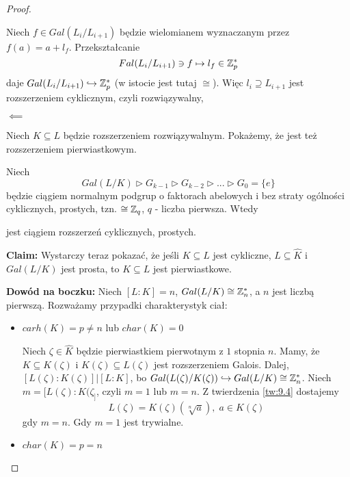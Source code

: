 \begin{proof}
\begin{itemize}
    Niech $f\in Gal(L_i/L_{i+1})$ będzie wielomianem wyznaczanym przez $f(a)=a+l_f$. Przekształcanie
    $$Fal(L_i/L_{i+1})\ni f\mapsto l_f\in \mathbb{Z}_p^*$$
    daje $Gal(L_i/L_{i+1})\hookrightarrow\mathbb{Z}_p^*$ (w istocie jest tutaj $\cong$). Więc $l_i\supseteq L_{i+1}$ jest rozszerzeniem cyklicznym, czyli rozwiązywalny,
\end{itemize}

$\impliedby$

Niech $K\subseteq L$ będzie rozszerzeniem rozwiązywalnym. Pokażemy, że jest też rozszerzeniem pierwiastkowym.

Niech
$$Gal(L/K)\triangleright G_{k-1}\triangleright G_{k-2}\triangleright...\triangleright G_0=\{e\}$$
będzie ciągiem normalnym podgrup o faktorach abelowych i bez straty ogólności cyklicznych, prostych, tzn. $\cong\mathbb{Z}_q$, $q$ - liczba pierwsza. Wtedy
\begin{center}\end{center}
jest ciągiem rozszerzeń cyklicznych, prostych.

\textbf{Claim:} Wystarczy teraz pokazać, że jeśli $K\subseteq L$ jest cykliczne, $L\subseteq\hat{K}$ i $Gal(L/K)$ jest prosta, to $K\subseteq L$ jest pierwiastkowe.

\textbf{Dowód na boczku:} Niech $[L:K]=n$, $Gal(L/K)\cong\mathbb{Z}_n^*$, a $n$ jest liczbą pierwszą. Rozważamy przypadki charakterystyk ciał:
\begin{itemize}
    \item $carh(K)=p\neq n$ lub $char(K)=0$

    Niech $\zeta\in\hat{K}$ będzie pierwiastkiem pierwotnym z $1$ stopnia $n$. Mamy, że $K\subseteq K(\zeta)$ i $K(\zeta)\subseteq L(\zeta)$ jest rozszerzeniem Galois. Dalej, $[L(\zeta):K(\zeta)]|[L:K]$, bo $Gal(L(\zeta)/K(\zeta))\hookrightarrow Gal(L/K)\cong\mathbb{Z}_n^*$. Niech $m=[L(\zeta):K(\zeta_]$, czyli $m=1$ lub $m=n$. Z twierdzenia \ref{tw:9.4} dostajemy
    $$L(\zeta)=K(\zeta)(\sqrt[n]{a}),\;a\in K(\zeta)$$
    gdy $m=n$. Gdy $m=1$ jest trywialne.
    \item $char(K)=p=n$


\end{itemize}
\end{proof}
